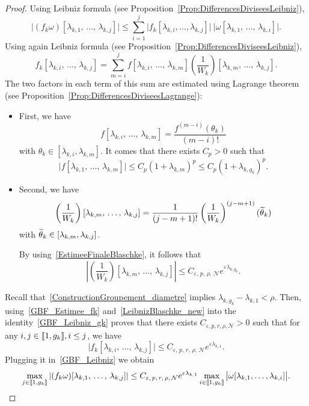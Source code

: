 \documentclass[10pt]{amsart}
\theoremstyle{definition}\newtheorem{defi}[theo]{Definition}\newtheorem{rema}[theo]{Remark}\newtheorem{exam}[theo]{Example}\newtheorem{exem}[theo]{Example}\newtheorem{nota}[theo]{Notation}
\newcommand{\llbracket}{\mathopen{[\mkern -2.7mu[}}
\newcommand{\rrbracket}{\mathclose{]\mkern -2.7mu]}}
\newcommand{\inter}[2]{\llbracket #1,#2 \rrbracket}
\newcommand{\n}{g}
\newcommand{\NN}{\mathcal{N}}
\let\oldtilde\tilde
\renewcommand*{\tilde}[1]{\mathchoice{\widetilde{#1}}{\widetilde{#1}}{\oldtilde{#1}}{\oldtilde{#1}}}\let\oldexists\exists
\renewcommand*{\exists}{\mathrel{\oldexists}}
\begin{document}
\begin{proof}
Using Leibniz formula (see Proposition~\ref{Prop:DifferencesDiviseesLeibniz}),
\begin{equation}\label{GBF_Leibniz}
\big| (f_k \omega) [\lambda_{k,1},\,\dots,\, \lambda_{k,j}] \big|
\leq \sum_{i=1}^j \big| f_k[\lambda_{k,i},\dots,\lambda_{k,j}] \big| \: \big| \omega[\lambda_{k,1},\,\dots,\,\lambda_{k,i}] \big|.
\end{equation}
Using again Leibniz formula (see Proposition~\ref{Prop:DifferencesDiviseesLeibniz}),
\begin{equation}\label{GBF_Leibniz_gk}
f_k[\lambda_{k,i},\,\dots,\,\lambda_{k,j}] = \sum_{m=i}^j f[\lambda_{k,i},\,\dots,\,\lambda_{k,m}] \left(\frac{1}{W_k} \right)[\lambda_{k,m},\,\dots,\,\lambda_{k,j}].
\end{equation}
The two factors in each term of this sum are estimated using Lagrange theorem (see Proposition~\ref{Prop:DifferencesDiviseesLagrange}):
\begin{itemize}
\item First, we have
\[
f[\lambda_{k,i},\,\dots,\,\lambda_{k,m}] = \frac{f^{(m-i)}(\theta_k)}{(m-i)!}
\]
with $\theta_k \in [\lambda_{k,i}, \lambda_{k,m}]$. It comes that there exists $C_p>0$ such that
\begin{equation}\label{GBF_Estimee_fk}
\big| f[\lambda_{k,1},\,\dots,\,\lambda_{k,m}] \big| \leq C_p (1+\lambda_{k,m})^p \leq C_p (1+\lambda_{k,\n_k})^p.
\end{equation}
\item Second, we have
\begin{equation*}
\left(\frac{1}{W_k} \right)[\lambda_{k,m},\, \dots,\,\lambda_{k,j}] = \frac{1}{(j-m+1)!} \left(\frac{1}{W_k} \right)^{(j-m+1)}(\tilde{\theta}_k)
\end{equation*}
with $\tilde{\theta}_k \in [\lambda_{k,m},\lambda_{k,j}]$.


By using~\eqref{EstimeeFinaleBlaschke}, it follows that
\begin{equation}\label{LeibnizBlaschke_new}
\left|\left(\frac{1}{W_k} \right)[\lambda_{k,m},\,\dots,\,\lambda_{k,j}]\right| \leq C_{\varepsilon,\,p,\, \rho,\, \NN} e^{\varepsilon \lambda_{k,\n_k}}.
\end{equation}
\end{itemize}


Recall that~\eqref{ConstructionGroupement_diametre} implies $\lambda_{k,\n_k} - \lambda_{k,1} < \rho$. Then, using~\eqref{GBF_Estimee_fk} and~\eqref{LeibnizBlaschke_new} into the identity~\eqref{GBF_Leibniz_gk} proves that there exists $C_{\varepsilon, p, r, \rho, \NN}>0$ such that for any $i,j\in \inter{1}{\n_k}, i\leq j$, we have
\[
\big| f_k[\lambda_{k,i},\,\dots,\, \lambda_{k,j}] \big| \leq C_{\varepsilon,\, p,\, r,\, \rho,\, \NN} e^{\varepsilon \lambda_{k,1}}.
\]
Plugging it in~\eqref{GBF_Leibniz} we obtain
\[
\max_{j\in \inter{1}{\n_k}} \left| (f_k \omega) [\lambda_{k,1},\,\dots,\, \lambda_{k,j}] \right| \leq C_{\varepsilon,\, p,\, r,\, \rho,\, \NN} e^{\varepsilon \lambda_{k,1}} \max \limits_{i\in \inter{1}{\n_k}} \big| \omega[\lambda_{k,1}, \dots, \lambda_{k,i}] \big|.
\]


\end{proof}
\end{document}
